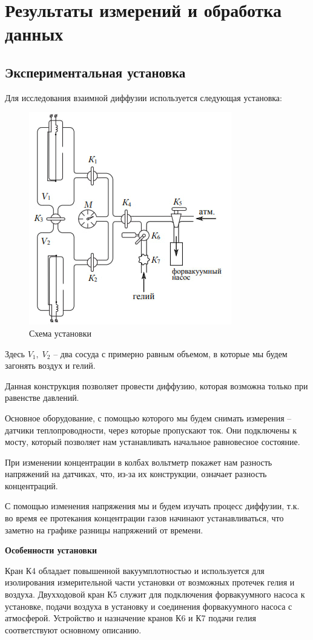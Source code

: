 \documentclass[
a4paper, %
12pt, %
]{article}
\begin{document}
	\section{Результаты измерений и обработка данных}
	
	\subsection{Экспериментальная установка}
	
	Для исследования взаимной диффузии используется следующая установка:
	
	\begin{figure}[h!]
		\centering
		\includegraphics[width=0.5\linewidth]{img/experiment_scheme.jpg}
		\caption{Схема установки}
		\label{fig:enter-label}
	\end{figure}
	Здесь $V_1,\; V_2$ -- два сосуда с примерно равным объемом, в которые мы будем загонять воздух и гелий.
	
	Данная конструкция позволяет провести диффузию, которая возможна только при равенстве давлений.
	
	Основное оборудование, с помощью которого мы будем снимать измерения -- датчики теплопроводности, через которые пропускают ток. Они подключены к мосту, который позволяет нам устанавливать начальное равновесное состояние.
	
	При изменении концентрации в колбах вольтметр покажет нам разность напряжений на датчиках, что, из-за их конструкции, означает разность концентраций. 
	
	С помощью изменения напряжения мы и будем изучать процесс диффузии, т.к. во время ее протекания концентрации газов начинают устанавливаться, что заметно на графике разницы напряжений от времени.
	
	\textbf{Особенности установки}
	
	Кран К4 обладает повышенной вакуумплотностью и используется для изолирования измерительной части установки от возможных протечек гелия и воздуха. Двухходовой кран К5 служит для подключения форвакуумного насоса к установке, подачи воздуха в установку и соединения форвакуумного насоса с атмосферой. Устройство и назначение кранов К6 и К7 подачи гелия соответствуют основному описанию.
	
\end{document}
